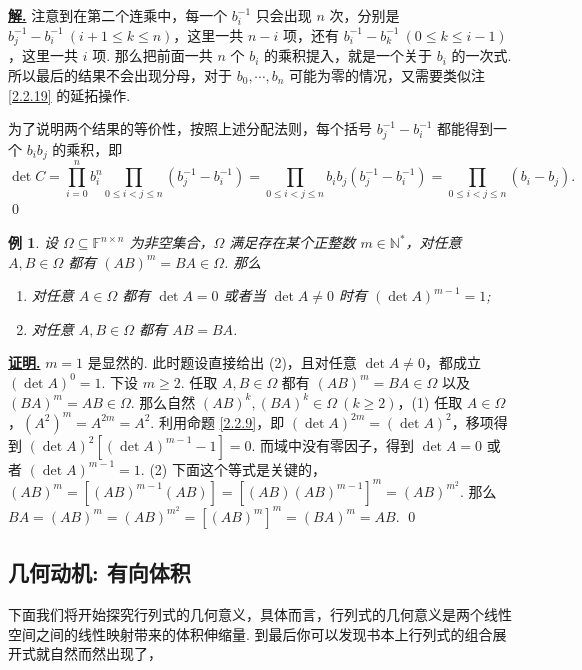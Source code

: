 \documentclass[10pt,openany]{article}
\theoremstyle{thmstyle} %
\theoremstyle{defstyle} %
\theoremstyle{prostyle} %
\theoremstyle{exastyle}
\newtheorem{example}[theorem]{例}
\theoremstyle{remstyle}
\renewenvironment{proof}[1][证明]{\par\underline{\textbf{#1.}} \;\fangsong}{\qed\par}
\newenvironment{solution}{\par\underline{\textbf{解.}} \;\fangsong}{\qed\par}
\newcommand{\F}{\mathbb{F}}
\newcommand{\n}{^{n \times n}}
\begin{document}
\begin{solution}
	注意到在第二个连乘中，每一个 \( b_i^{-1} \) 只会出现 \( n \) 次，分别是 \( b_j^{-1}-b_i^{-1} \ (i+1 \leq k \leq n) \)，这里一共 \( n-i \) 项，还有 \( b_i^{-1}-b_k^{-1} \ (0 \leq k \leq i-1) \)，这里一共 \( i \) 项. 那么把前面一共 \( n \) 个 \( b_i \) 的乘积提入，就是一个关于 \( b_i \) 的一次式. 所以最后的结果不会出现分母，对于 \( b_0,\cdots,b_n  \) 可能为零的情况，又需要类似注 \ref{2.2.19} 的延拓操作.
	
	为了说明两个结果的等价性，按照上述分配法则，每个括号 \( b_j^{-1}-b_i^{-1} \) 都能得到一个 \(b_ib_j \) 的乘积，即
	\[ \det C= \prod_{i=0}^{n} b_i^n \prod_{0 \leq i<j \leq n}^{} (b_j^{-1}-b_i^{-1})= \prod_{0 \leq i<j \leq n}^{} b_ib_j (b_j^{-1}-b_i^{-1})=\prod_{0 \leq i<j \leq n}^{}  (b_i-b_j). \]
\end{solution}

\begin{example}
	设 \( \Omega \subseteq \F\n \) 为非空集合，\( \Omega \) 满足存在某个正整数 \( m \in \mathbb{N}^* \)，对任意 \( A,B \in \Omega \) 都有 \( (AB)^{m}=BA \in \Omega \). 那么
	\begin{enumerate}[(1)]
		\item 对任意 \( A \in \Omega \) 都有 \( \det A=0 \) 或者当 \( \det A \neq 0 \) 时有 \( (\det A)^{m-1}=1  \);
		\item 对任意 \( A,B \in \Omega \) 都有 \( AB=BA \).
	\end{enumerate}
\end{example}

\begin{proof}
	\( m=1 \) 是显然的. 此时题设直接给出 (2)，且对任意 \( \det A \neq 0 \)，都成立 \( (\det A)^{0}=1 \). 下设 \( m \geq 2 \). 任取 \( A,B \in \Omega \) 都有 \( (AB)^m=BA \in \Omega \) 以及 \( (BA)^m=AB \in \Omega \). 那么自然 \( (AB)^k, (BA)^k \in \Omega \ (k \geq 2) \)，(1) 任取 \( A \in \Omega \)，\( (A^2)^{m}=A^{2m}=A^2 \). 利用命题 \ref{2.2.9}，即 \( (\det A)^{2m}=(\det A)^2 \)，移项得到 \( (\det A)^2 [(\det A)^{m-1}-1]=0 \). 而域中没有零因子，得到 \( \det A=0 \) 或者 \( (\det A)^{m-1}=1 \). (2) 下面这个等式是关键的，\( (AB)^m=[(AB)^{m-1}(AB)]=[(AB)(AB)^{m-1}]^m=(AB)^{m^2} \). 那么 \( BA=(AB)^m=(AB)^{m^2}=[(AB)^m]^m=(BA)^m=AB \).
\end{proof}

\subsection{几何动机: 有向体积}
\label{2.3}

下面我们将开始探究行列式的几何意义，具体而言，行列式的几何意义是两个线性空间之间的线性映射带来的体积伸缩量. 到最后你可以发现书本上行列式的组合展开式就自然而然出现了，
\end{document}
